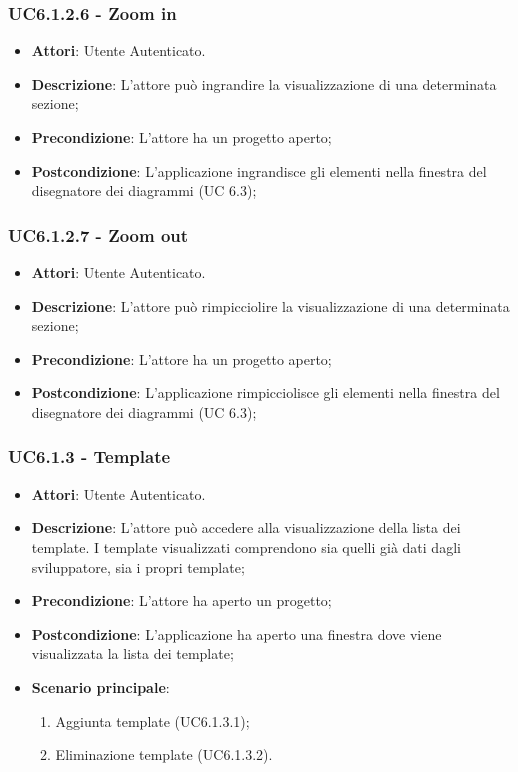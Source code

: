 \subsubsection{UC6.1.2.6 - Zoom in} 
\label{sssec:UC6.1.2.6} 
\begin{itemize} 
\item \textbf{Attori}: Utente Autenticato.
\item \textbf{Descrizione}: L’attore può ingrandire la visualizzazione di una determinata sezione;
\item \textbf{Precondizione}: L’attore ha un progetto aperto;
\item \textbf{Postcondizione}: L’applicazione ingrandisce gli elementi nella finestra del disegnatore dei diagrammi (UC 6.3);
\end{itemize} 
\subsubsection{UC6.1.2.7 - Zoom out} 
\label{sssec:UC6.1.2.7} 
\begin{itemize} 
\item \textbf{Attori}: Utente Autenticato.
\item \textbf{Descrizione}: L’attore può rimpicciolire la visualizzazione di una determinata sezione;
\item \textbf{Precondizione}: L’attore ha un progetto aperto;
\item \textbf{Postcondizione}: L’applicazione rimpicciolisce gli elementi nella finestra del disegnatore dei diagrammi (UC 6.3);
\end{itemize} 
\subsubsection{UC6.1.3 - Template} 
\label{sssec:UC6.1.3} 
\begin{itemize} 
\item \textbf{Attori}: Utente Autenticato.
\item \textbf{Descrizione}: L’attore può accedere alla visualizzazione della lista dei template. I template visualizzati comprendono sia quelli già dati dagli sviluppatore, sia i propri template;
\item \textbf{Precondizione}: L’attore ha aperto un progetto;
\item \textbf{Postcondizione}: L'applicazione ha aperto una finestra dove viene visualizzata la lista dei template;
\item \textbf{Scenario principale}: \begin{enumerate}\item Aggiunta template (UC6.1.3.1);\item Eliminazione template (UC6.1.3.2). 
 \end{enumerate}
\end{itemize} 
